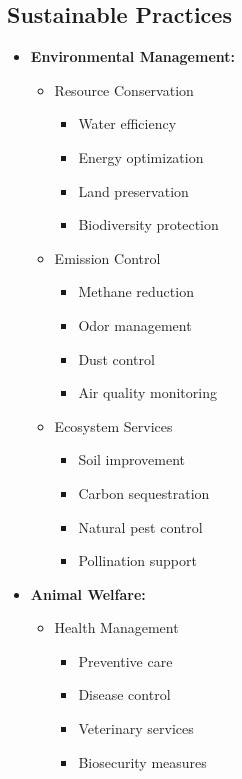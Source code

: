 \subsection{Sustainable Practices}
\begin{itemize}
    \item \textbf{Environmental Management:}
    \begin{itemize}
        \item Resource Conservation
        \begin{itemize}
            \item Water efficiency
            \item Energy optimization
            \item Land preservation
            \item Biodiversity protection
        \end{itemize}
        
        \item Emission Control
        \begin{itemize}
            \item Methane reduction
            \item Odor management
            \item Dust control
            \item Air quality monitoring
        \end{itemize}
        
        \item Ecosystem Services
        \begin{itemize}
            \item Soil improvement
            \item Carbon sequestration
            \item Natural pest control
            \item Pollination support
        \end{itemize}
    \end{itemize}
    
    \item \textbf{Animal Welfare:}
    \begin{itemize}
        \item Health Management
        \begin{itemize}
            \item Preventive care
            \item Disease control
            \item Veterinary services
            \item Biosecurity measures
        \end{itemize}
        

\end{itemize}
\end{itemize}
